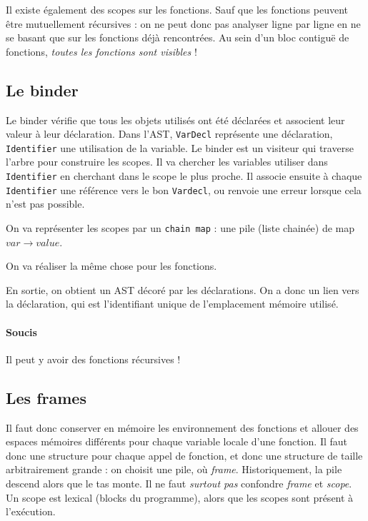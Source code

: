 \documentclass{article}
\begin{document}
Il existe également des scopes sur les fonctions. Sauf que les fonctions peuvent être mutuellement récursives : on ne peut donc pas analyser ligne par ligne en ne se basant que sur les fonctions déjà rencontrées. Au sein d'un bloc contiguë de fonctions, \emph{toutes les fonctions sont visibles} !


\subsection{Le binder}
Le binder vérifie que tous les objets utilisés ont été déclarées et associent leur valeur à leur déclaration.
Dans l'AST, \texttt{VarDecl} représente une déclaration, \texttt{Identifier} une utilisation de la variable. Le binder est un visiteur qui traverse l'arbre pour construire les scopes. Il va chercher les variables utiliser dans \texttt{Identifier} en cherchant dans le scope le plus proche. Il associe ensuite à chaque \texttt{Identifier} une référence vers le bon \texttt{Vardecl}, ou renvoie une erreur lorsque cela n'est pas possible.

On va représenter les scopes par un \texttt{chain map} : une pile (liste chainée) de map $var \to value$.

On va réaliser la même chose pour les fonctions.

En sortie, on obtient un AST décoré par les déclarations. On a donc un lien vers la déclaration, qui est l'identifiant unique de l'emplacement mémoire utilisé.


\paragraph{Soucis}
Il peut y avoir des fonctions récursives !


\subsection{Les frames}
Il faut donc conserver en mémoire les environnement des fonctions et allouer des espaces mémoires différents pour chaque variable locale d'une fonction. Il faut donc une structure pour chaque appel de fonction, et donc une structure de taille arbitrairement grande : on choisit une pile, où \emph{frame}.  Historiquement, la pile descend alors que le tas monte. Il ne faut \emph{surtout pas} confondre \emph{frame} et \emph{scope}. Un scope est lexical (blocks du programme), alors que les scopes sont présent à l'exécution.
\end{document}
